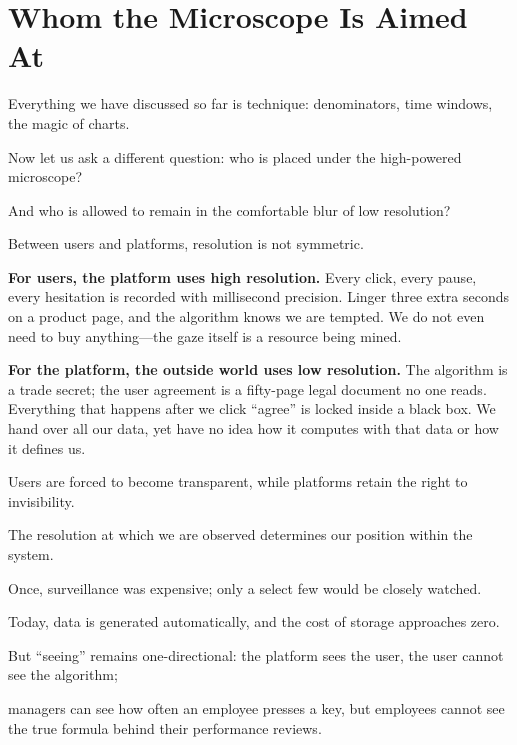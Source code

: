 \newpage
\section{Whom the Microscope Is Aimed At}
Everything we have discussed so far is technique: denominators, time windows, the magic of charts.

Now let us ask a different question: who is placed under the high-powered microscope?

And who is allowed to remain in the comfortable blur of low resolution?

\vspace{1em}

Between users and platforms, resolution is not symmetric.

\textbf{For users, the platform uses high resolution.} Every click, every pause, every hesitation is recorded with millisecond precision. Linger three extra seconds on a product page, and the algorithm knows we are tempted. We do not even need to buy anything---the gaze itself is a resource being mined.

\vspace{1em}

\textbf{For the platform, the outside world uses low resolution.} The algorithm is a trade secret; the user agreement is a fifty-page legal document no one reads. Everything that happens after we click ``agree'' is locked inside a black box. We hand over all our data, yet have no idea how it computes with that data or how it defines us.

\vspace{1em}

Users are forced to become transparent, while platforms retain the right to invisibility.

The resolution at which we are observed determines our position within the system.

Once, surveillance was expensive; only a select few would be closely watched.

Today, data is generated automatically, and the cost of storage approaches zero.

But ``seeing'' remains one-directional: the platform sees the user, the user cannot see the algorithm;

managers can see how often an employee presses a key, but employees cannot see the true formula behind their performance reviews.

\vspace{1em}

